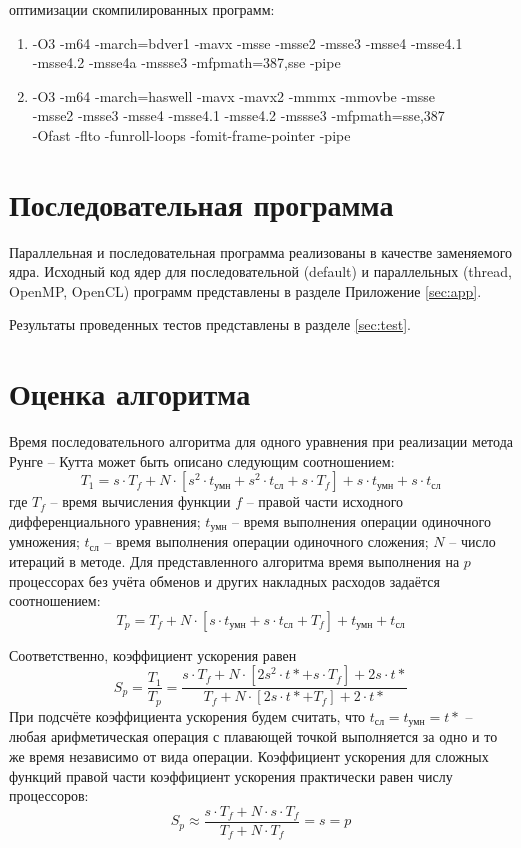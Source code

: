 \documentclass[14pt,final,titlepage,pscyr]{hedwork}
\begin{document}
 оптимизации скомпилированных программ:
\begin{enumerate}
	\item -O3 -m64 -march=bdver1 -mavx -msse -msse2 -msse3 -msse4 -msse4.1 \\
		-msse4.2 -msse4a -mssse3 -mfpmath=387,sse -pipe
	\item -O3 -m64 -march=haswell -mavx -mavx2 -mmmx -mmovbe -msse \\
		-msse2 -msse3 -msse4 -msse4.1 -msse4.2 -mssse3 -mfpmath=sse,387 \\
		-Ofast -flto -funroll-loops -fomit-frame-pointer -pipe
\end{enumerate}

\newpage

\section{Последовательная программа}
Параллельная и последовательная программа реализованы в качестве заменяемого ядра. Исходный код ядер для 
последовательной (default) и параллельных (thread, OpenMP, OpenCL) программ представлены в разделе 
Приложение \eqref{sec:app}.

Результаты проведенных тестов представлены в разделе \ref{sec:test}. 

\section{Оценка алгоритма}
Время последовательного алгоритма для одного уравнения при реализации метода Рунге -- Кутта может быть 
описано следующим соотношением:
\[
	T_1 = s\cdot T_f + N \cdot \left[ s^2 \cdot t_\text{умн} + s^2 \cdot t_\text{сл} + 
		s \cdot T_f \right] + s \cdot t_\text{умн} + s \cdot t_\text{сл}
\]
где \( T_f \) -- время вычисления функции \( f \) -- правой части исходного дифференциального уравнения;
\( t_\text{умн} \) -- время выполнения операции одиночного умножения; \( t_\text{сл} \) -- время 
выполнения операции одиночного сложения; \( N \) -- число итераций в методе. Для представленного алгоритма 
время выполнения на \( p \) процессорах без учёта обменов и других накладных расходов задаётся соотношением:
\[
	T_p = T_f + N \cdot \left[ s \cdot t_\text{умн} + s \cdot t_\text{сл} + T_f \right] + 
		t_\text{умн} + t_\text{сл}
\]

Соответственно, коэффициент ускорения равен
\[
	S_p = \frac{T_1}{T_p} = \frac{s\cdot T_f + N\cdot\left[ 2s^2 \cdot t* + s\cdot T_f\right] + 2s\cdot t*}
			{T_f + N\cdot\left[ 2s\cdot t* + T_f\right] + 2\cdot t*}
\]
При подсчёте коэффициента ускорения будем считать, что \( t_\text{сл} = t_\text{умн} = t* \) -- любая 
арифметическая операция с плавающей точкой выполняется за одно и то же время независимо от вида операции.
Коэффициент ускорения для сложных функций правой части коэффициент ускорения практически равен числу 
процессоров:
\[
	S_p \approx \frac{s \cdot T_f + N \cdot s \cdot T_f}{T_f + N \cdot T_f } = s = p
\]
\end{document}
